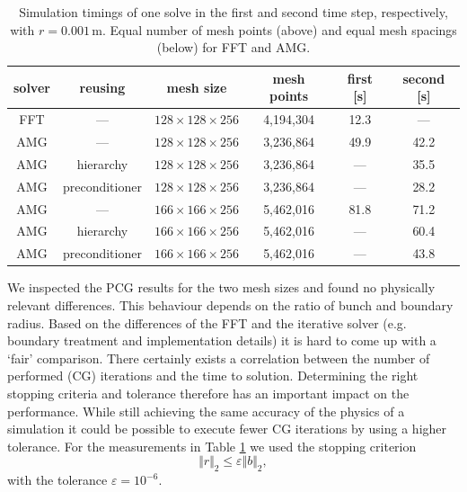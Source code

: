 \documentclass[a4paper,10pt,3p,final,pdftex]{elsarticle}
\begin{document}
\begin{table}[ht]
  \begin{center}
    \begin{tabular}{cccccc}
    \hline
        solver & reusing & mesh size & mesh points & first [s] & second [s] \\
        \hline
        FFT & --- & $128\times128\times256$ & 4,194,304 & 12.3 & --- \\
        \hline
        AMG & --- & $128\times128\times256$ & 3,236,864 & 49.9 & 42.2 \\
        AMG & hierarchy & $128\times128\times256$ & 3,236,864 & --- & 35.5 \\
        AMG & preconditioner & $128\times128\times256$ & 3,236,864 & --- & 28.2 \\
        \hline
        AMG & --- & $166\times166\times256$ & 5,462,016 & 81.8 & 71.2 \\
        AMG & hierarchy & $166\times166\times256$ & 5,462,016 & --- & 60.4 \\
        AMG & preconditioner & $166\times166\times256$ & 5,462,016 & --- & 43.8 \\
        \hline
  \end{tabular}
  \caption{Simulation timings of one solve in the first and second time
    step, respectively, with $r=0.001$\,m.  Equal number of mesh points
    (above) and equal mesh spacings (below) for FFT and AMG.}
  \label{tbl:timings_variations_overview} \end{center}
\end{table}


We inspected the PCG results for the two mesh sizes and found no
physically relevant differences. This behaviour depends on the ratio of
bunch and boundary radius.  Based on the differences of the FFT and
the iterative solver (e.g. boundary treatment and implementation details) it
is hard to come up with a `fair' comparison.  There certainly exists a
correlation between the number of performed (CG) iterations and the time
to solution.  Determining the right stopping criteria and tolerance
therefore has an important impact on the performance.  While still
achieving the same accuracy of the physics of a simulation it could be
possible to execute fewer CG iterations by using a higher tolerance.
For the measurements in Table \ref{tbl:timings_variations_overview} we
used the stopping criterion
\begin{equation*}
  \Vert r \Vert_2 \le \varepsilon  {\Vert b \Vert_2},
\end{equation*}
with the tolerance $\varepsilon = 10^{-6}$.
\end{document}
